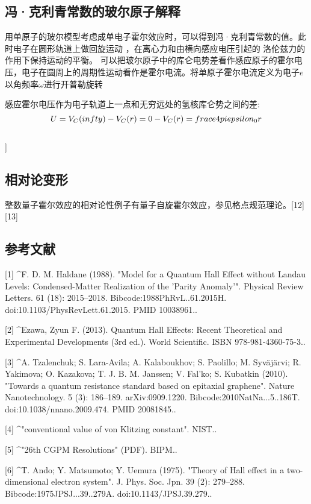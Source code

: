 \subsection{冯·克利青常数的玻尔原子解释}
用单原子的玻尔模型考虑成单电子霍尔效应时，可以得到冯·克利青常数的值。此时电子在圆形轨道上做回旋运动 ，在离心力和由横向感应电压引起的 洛伦兹力的作用下保持运动的平衡。 可以把玻尔原子中的库仑电势差看作感应原子的霍尔电压，电子在圆周上的周期性运动看作是霍尔电流。将单原子霍尔电流定义为电子$e$以角频率$\omega$进行开普勒旋转

感应霍尔电压作为电子轨道上一点和无穷远处的氢核库仑势之间的差:
$$U = V_C(\\infty) - V_C(r) = 0 - V_C(r) = \\frac{e}{4 \\pi \\epsilon_0 r}$$\\]$$

\subsection{相对论变形}
整数量子霍尔效应的相对论性例子有量子自旋霍尔效应，参见格点规范理论。[12][13]

\subsection{参考文献}
[1]
^F. D. M. Haldane (1988). "Model for a Quantum Hall Effect without Landau Levels: Condensed-Matter Realization of the 'Parity Anomaly'". Physical Review Letters. 61 (18): 2015–2018. Bibcode:1988PhRvL..61.2015H. doi:10.1103/PhysRevLett.61.2015. PMID 10038961..

[2]
^Ezawa, Zyun F. (2013). Quantum Hall Effects: Recent Theoretical and Experimental Developments (3rd ed.). World Scientific. ISBN 978-981-4360-75-3..

[3]
^A. Tzalenchuk; S. Lara-Avila; A. Kalaboukhov; S. Paolillo; M. Syväjärvi; R. Yakimova; O. Kazakova; T. J. B. M. Janssen; V. Fal'ko; S. Kubatkin (2010). "Towards a quantum resistance standard based on epitaxial graphene". Nature Nanotechnology. 5 (3): 186–189. arXiv:0909.1220. Bibcode:2010NatNa...5..186T. doi:10.1038/nnano.2009.474. PMID 20081845..

[4]
^"conventional value of von Klitzing constant". NIST..

[5]
^"26th CGPM Resolutions" (PDF). BIPM..

[6]
^T. Ando; Y. Matsumoto; Y. Uemura (1975). "Theory of Hall effect in a two-dimensional electron system". J. Phys. Soc. Jpn. 39 (2): 279–288. Bibcode:1975JPSJ...39..279A. doi:10.1143/JPSJ.39.279..

